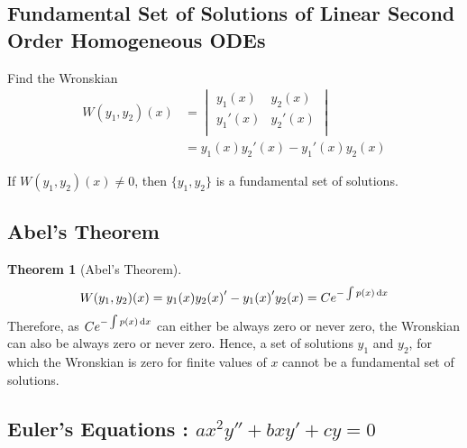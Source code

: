 \documentclass[fleqn, a4paper, 8pt, twoside]{amsart}
\theoremstyle{definition}
\theoremstyle{theorem}
\newtheorem{theorem}{Theorem}
\begin{document}
\begin{multicols}{2}
\begin{spacing}{0.85}
\subsection{Fundamental Set of Solutions of Linear Second Order Homogeneous ODEs}

\begin{algorithmic}[1]
	\item
		Find the Wronskian
		\begin{align*}
			W(y_1, y_2)(x) &=
				\begin{vmatrix}
					y_1(x) & y_2(x)\\
					{y_1}'(x) & {y_2}'(x)\\
				\end{vmatrix}\\
			&= y_1(x) {y_2}'(x) - {y_1}'(x) y_2(x)
		\end{align*}
	\item
		If $W(y_1, y_2)(x) \neq 0$, then $\{y_1, y_2\}$ is a fundamental set of solutions.
\end{algorithmic}

\subsection{Abel's Theorem}

\begin{theorem}[Abel's Theorem]
	\begin{equation*}
		W(y_1, y_2)(x) = y_1(x) {y_2(x)}' - {y_1(x)}' y_2(x) = C e^{-\int p(x) \dif x}
	\end{equation*}
	Therefore, as $C e^{-\int p(x) \dif x}$ can either be always zero or never zero, the Wronskian can also be always zero or never zero.
	Hence, a set of solutions $y_1$ and $y_2$, for which the Wronskian is zero for finite values of $x$ cannot be a fundamental set of solutions.
\end{theorem}

\subsection{Euler's Equations : $a x^2 y'' + b x y' + c y = 0$}


\end{spacing}
\end{multicols}
\end{document}
